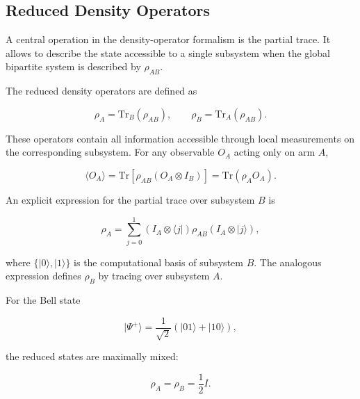 \subsection{Reduced Density Operators}
\label{subsec:reduced_density_operators}

A central operation in the density-operator formalism is the partial trace. It allows to describe the state accessible to a single subsystem when the global bipartite system is described by \( \rho_{AB} \).

\medskip

The reduced density operators are defined as

\begin{equation}
\rho_A
=
\mathrm{Tr}_B(\rho_{AB}),
\qquad
\rho_B
=
\mathrm{Tr}_A(\rho_{AB}).
\label{eq:reduced_density_operator_definition}
\end{equation}

These operators contain all information accessible through local measurements on the corresponding subsystem. For any observable \( O_A \) acting only on arm \( A \),

\begin{equation}
\langle O_A \rangle
=
\mathrm{Tr}
\left[
\rho_{AB}
\left(
O_A \otimes I_B
\right)
\right]
=
\mathrm{Tr}(\rho_A O_A).
\label{eq:local_expectation_reduced_state}
\end{equation}

\medskip

An explicit expression for the partial trace over subsystem \( B \) is

\begin{equation}
\rho_A
=
\sum_{j=0}^{1}
\left(
I_A \otimes \langle j|
\right)
\rho_{AB}
\left(
I_A \otimes |j\rangle
\right),
\label{eq:partial_trace_expression}
\end{equation}

where \( \{|0\rangle, |1\rangle\} \) is the computational basis of subsystem \( B \). The analogous expression defines \( \rho_B \) by tracing over subsystem \( A \).

\medskip

For the Bell state

\[
|\Psi^+\rangle
=
\frac{1}{\sqrt{2}}
\left(
|01\rangle + |10\rangle
\right),
\]

the reduced states are maximally mixed:

\begin{equation}
\rho_A
=
\rho_B
=
\frac{1}{2}I.
\label{eq:bell_reduced_states}
\end{equation}

